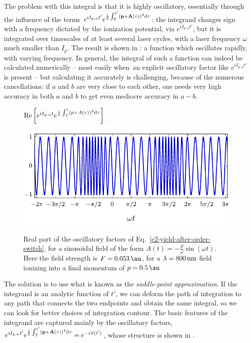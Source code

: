The problem with this integral is that it is highly oscillatory, essentially through the influence of the terms $e^{i I_{p,n} t'} e^{\frac{i}{2} \int_T^{t'} \left(\vb{p}+ \vb{A}(\tau) \right)^2\mathrm{d}\tau}$: the integrand changes sign with a frequency dictated by the ionization potential, via $e^{i I_{p,n} t'}$, but it is integrated over timescales of at least several laser cycles, with a laser frequency $\omega$ much smaller than $I_p$. The result is shown in : a function which oscillates rapidly, with varying frequency. In general, the integral of such a function can indeed be calculated numerically -- most easily when\ an explicit oscillatory factor like $e^{i I_{p,n} t'}$ is present -- but calculating it accurately is challenging, because of the numerous cancellations: if $a$ and $b$ are very close to each other, one needs very high accuracy in both $a$ and $b$ to get even mediocre accuracy in $a-b$.


%
\begin{figure}[htb]
  \centering
  $\Re\left[
  e^{i I_{p,n} t}e^{\frac{i}{2} \int_T^{t}\left(p+A(\tau)\right)^2\mathrm{d}\tau}
  \right]$\\[-3mm]
  \includegraphics[scale=1]{2-ARM-theory/Figures/figure2A.pdf}
  \caption[Oscillatory factors of the SFA integrand prior to the saddle-point approximation]{%
  Real part of the oscillatory factors of Eq.~\eqref{e2-yield-after-order-switch}, for a sinusoidal field of the form $A(t)=-\frac{F}{\omega}\sin(\omega t)$.
  Here the field strength is $F=\SI{\figuretwoAfield}{\au}$, for a $\lambda= \SI{800}{nm}$ field ionizing \figuretwoAtarget{} into a final momentum of $p=\SI{\figuretwoAmomentum}{\au}$
  }
  \label{f2-oscillatory-factors}
\end{figure}


The solution is to use what is known as the \textit{saddle-point approximation}. If the integrand is an analytic function of $t'$, we can deform the path of integration to any path that connects the two endpoints and obtain the same integral, so we can look for better choices of integration contour. The basic features of the integrand are captured mainly by the oscillatory factors, $e^{i I_{p,n} t'} e^{\frac{i}{2} \int_T^{t'} \left(\vb{p}+ \vb{A}(\tau) \right)^2\mathrm{d}\tau}=e^{-iS(t')}$, whose structure is shown in . 

